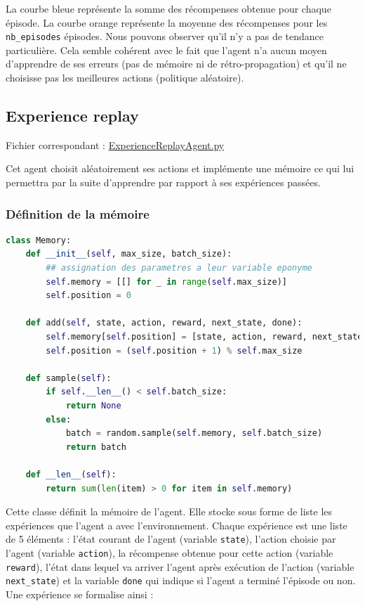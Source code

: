 \documentclass[10pt,a4paper]{article}
\begin{document}
La courbe bleue représente la somme des récompenses obtenue pour chaque épisode. La courbe orange représente la moyenne des récompenses pour les \lstinline{nb_episodes} épisodes. Nous pouvons observer qu'il n'y a pas de tendance particulière. Cela semble cohérent avec le fait que l'agent n'a aucun moyen d'apprendre de ses erreurs (pas de mémoire ni de rétro-propagation) et qu'il ne choisisse pas les meilleures actions (politique aléatoire). 

\subsection{Experience replay}

Fichier correspondant : \href{https://github.com/NellyBarret/IA5-TP-APR/blob/master/sources/ExperienceReplayAgent.py}{ExperienceReplayAgent.py}

Cet agent choisit aléatoirement ses actions et implémente une mémoire ce qui lui permettra par la suite d'apprendre par rapport à ses expériences passées.

\subsubsection{Définition de la mémoire}

\begin{lstlisting}[language=Python, caption=Implémentation de la mémoire d'un agent]
class Memory:
    def __init__(self, max_size, batch_size):
        ## assignation des parametres a leur variable eponyme
        self.memory = [[] for _ in range(self.max_size)]
        self.position = 0

    def add(self, state, action, reward, next_state, done):
        self.memory[self.position] = [state, action, reward, next_state, done]
        self.position = (self.position + 1) % self.max_size

    def sample(self):
        if self.__len__() < self.batch_size:
            return None
        else:
            batch = random.sample(self.memory, self.batch_size)
            return batch

    def __len__(self):
        return sum(len(item) > 0 for item in self.memory)
\end{lstlisting}

Cette classe définit la mémoire de l'agent. Elle stocke sous forme de liste les expériences que l'agent a avec l'environnement. Chaque expérience est une liste de 5 éléments : l'état courant de l'agent (variable \lstinline{state}), l'action choisie par l'agent (variable \lstinline{action}), la récompense obtenue pour cette action (variable \lstinline{reward}), l'état dans lequel va arriver l'agent après exécution de l'action (variable \lstinline{next_state}) et la variable \lstinline{done} qui indique si l'agent a terminé l'épisode ou non. Une expérience se formalise ainsi :
\end{document}
